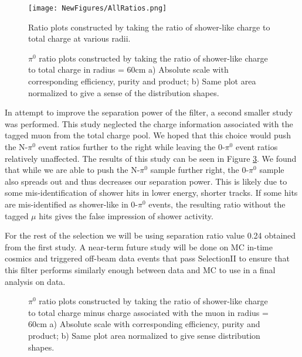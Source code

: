 \documentclass[12pt]{article}
\begin{document}
\begin{figure}[h!]
\centering
\texttt{[image: NewFigures/AllRatios.png]}
\caption{Ratio plots constructed by taking the ratio of shower-like charge to total charge at various radii. }
\label{fig:all_radii}
\end{figure}


\begin{figure}[H]
\centering
{}
\hspace{1 mm}
\caption{$\pi^0$ ratio plots constructed by taking the ratio of shower-like charge to total charge in radius = 60cm a) Absolute scale with corresponding efficiency, purity and product; b) Same plot area normalized to give a sense of the distribution shapes. }
\label{fig:separation}
\end{figure}

In attempt to improve the separation power of the filter, a second smaller study was performed. This study neglected the charge information associated with the tagged muon from the total charge pool. We hoped that this choice would push the N-$\pi^0$ event ratios further to the right while leaving the 0-$\pi^0$ event ratios relatively unaffected.  The results of this study can be seen in Figure \ref{fig:separation_no_mu}.  We found that while we are able to push the N-$\pi^0$ sample further right, the 0-$\pi^0$ sample also spreads out and thus decreases our separation power. This is likely due to some mis-identification of shower hits in lower energy, shorter tracks.  If some hits are mis-identified as shower-like in 0-$\pi^0$ events, the resulting ratio without the tagged $\mu$ hits gives the false impression of shower activity. 
\par For the rest of the selection we will be using separation ratio value 0.24 obtained from the first study. A near-term future study will be done on MC in-time cosmics and triggered off-beam data events that pass SelectionII to ensure that this filter performs similarly enough between data and MC to use in a final analysis on data.

\begin{figure}[H]
\centering
{}
\hspace{1 mm}
\caption{$\pi^0$ ratio plots constructed by taking the ratio of shower-like charge to total charge minus charge associated with the muon in radius = 60cm a) Absolute scale with corresponding efficiency, purity and product; b) Same plot area normalized to give sense distribution shapes. }
\label{fig:separation_no_mu}
\end{figure}
\end{document}
